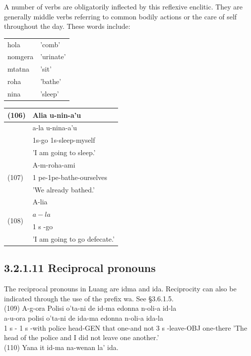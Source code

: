 \documentclass[10pt]{article}
\begin{document}
A number of verbs are obligatorily inflected by this reflexive enclitic. They are generally middle verbs referring to common bodily actions or the care of self throughout the day. These words include:

\begin{center}
\begin{tabular}{ll}
hola & 'comb' \\
nomgera & 'urinate' \\
mtatna & 'sit' \\
roha & 'bathe' \\
nina & 'sleep' \\
\end{tabular}
\end{center}

\begin{center}
\begin{tabular}{|l|l|}
\hline
\multirow[t]{4}{*}{(106)} & Alia u-nin-a'u \\
\hline
 & a-la u-nina-a'u \\
\hline
 & 1s-go 1s-sleep-myself \\
\hline
 & 'I am going to sleep.' \\
\hline
\multirow[t]{3}{*}{(107)} & A-m-roha-ami \\
\hline
 & 1 pe-1pe-bathe-ourselves \\
\hline
 & 'We already bathed.' \\
\hline
\multirow[t]{4}{*}{(108)} & A-lia \\
\hline
 & \(a-l a\) \\
\hline
 & 1 s -go \\
\hline
 & 'I am going to go defecate.' \\
\hline
\end{tabular}
\end{center}

\subsection*{3.2.1.11 Reciprocal pronouns}
The reciprocal pronouns in Luang are idma and ida. Reciprocity can also be indicated through the use of the prefix wa. See §3.6.1.5.\\
(109) A-g-ora Polisi o'ta-ni de id-ma edonna n-oli-a id-la\\
a-u-ora polisi o'ta-ni de ida-ma edonna n-oli-a ida-la\\
1 s - 1 s -with police head-GEN that one-and not 3 s -leave-OBJ one-there 'The head of the police and I did not leave one another.'\\
(110) Yana it id-ma na-wenan la' ida.
\end{document}
